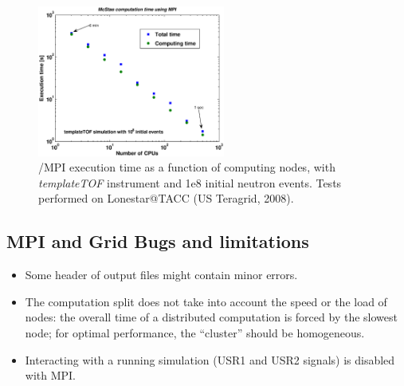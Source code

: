 \begin{figure}[htb!]
  \begin{center}
    \includegraphics[width=0.55\textwidth]{figures/mpi_efficiency.eps}
  \end{center}
\caption{\MCX /MPI execution time as a function of computing nodes, with {\it templateTOF} instrument and 1e8 initial neutron events. Tests performed on Lonestar@TACC (US Teragrid, 2008).}
\label{fig:mpi_efficiency}
\end{figure}

\subsection{MPI and Grid Bugs and limitations}

\begin{itemize}
\item Some header of output files might contain minor errors.
\item The computation split does not take into account the speed or the
  load of nodes: the overall time of a distributed computation is
  forced by the slowest node; for optimal performance, the ``cluster''
  should be homogeneous.
\item Interacting with a running simulation (USR1 and USR2 signals) is disabled 
  with MPI.
\end{itemize}

